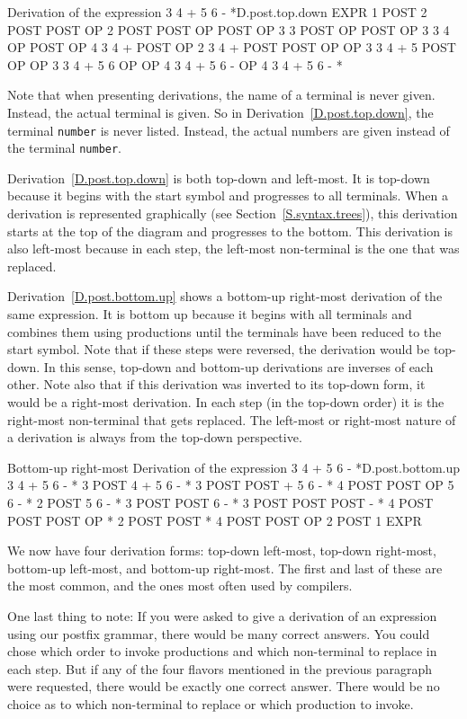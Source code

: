 \documentclass[letterpaper,12pt,openany,reqno]{book}%
\newcommand{\code}[1] {\lstinline[breaklines=yes,breakatwhitespace=yes]{#1}}
\begin{document}
\begin{derivation}{Derivation of the expression 3 4 + 5 6 - *}{D.post.top.down}
    EXPR
1   POST
2   POST POST OP
2   POST POST OP POST OP
3   3 POST OP POST OP
3   3 4 OP POST OP
4   3 4 + POST OP
2   3 4 + POST POST OP OP
3   3 4 + 5 POST OP OP
3   3 4 + 5 6 OP OP
4   3 4 + 5 6 - OP
4   3 4 + 5 6 - *
\end{derivation}
Note that when presenting derivations, the name of a terminal is never given. Instead, the actual terminal is given. So in Derivation~\ref{D.post.top.down}, the terminal \code{number} is never listed. Instead, the actual numbers are given instead of the terminal \code{number}.

Derivation~\ref{D.post.top.down} is both top-down and left-most. It is top-down because it begins with the start symbol and progresses to all terminals. When a derivation is represented graphically (see Section~\ref{S.syntax.trees}), this derivation starts at the top of the diagram and progresses to the bottom. This derivation is also left-most because in each step, the left-most non-terminal is the one that was replaced.

Derivation~\ref{D.post.bottom.up} shows a bottom-up right-most derivation of the same expression. It is bottom up because it begins with all terminals and combines them using productions until the terminals have been reduced to the start symbol. Note that if these steps were reversed, the derivation would be top-down. In this sense, top-down and bottom-up derivations are inverses of each other. Note also that if this derivation was inverted to its top-down form, it would be a right-most derivation. In each step (in the top-down order) it is the right-most non-terminal that gets replaced. The left-most or right-most nature of a derivation is always from the top-down perspective.
\begin{derivation}{Bottom-up right-most Derivation of the expression 3 4 + 5 6 - *}{D.post.bottom.up}
    3 4 + 5 6 - *
3   POST 4 + 5 6 - *
3   POST POST + 5 6 - *
4   POST POST OP 5 6 - *
2   POST 5 6 - *
3   POST POST 6 - *
3   POST POST POST - *
4   POST POST POST OP *
2   POST POST *
4   POST POST OP
2   POST
1   EXPR
\end{derivation}

We now have four derivation forms: top-down left-most, top-down right-most, bottom-up left-most, and bottom-up right-most. The first and last of these are the most common, and the ones most often used by compilers. 

One last thing to note: If you were asked to give a derivation of an expression using our postfix grammar, there would be many correct answers. You could chose which order to invoke productions and which non-terminal to replace in each step. But if any of the four flavors mentioned in the previous paragraph were requested, there would be exactly one correct answer. There would be no choice as to which non-terminal to replace or which production to invoke. 
\end{document}
